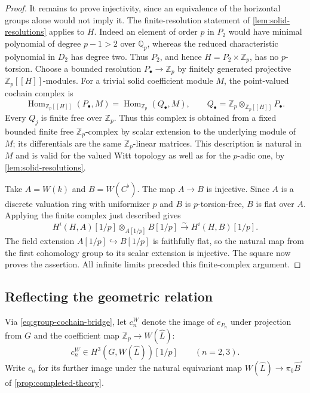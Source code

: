 \documentclass[11pt]{article}
\numberwithin{equation}{section}
\theoremstyle{definition}
\theoremstyle{remark}
\begin{document}
\begin{proof}
It remains to prove injectivity, since an equivalence of the horizontal
groups alone would not imply it.  The finite-resolution statement of
\cref{lem:solid-resolutions} applies to $H$.  Indeed an element of
order $p$ in $P_2$ would have minimal polynomial of degree $p-1>2$
over $\mathbb Q_p$, whereas the reduced characteristic polynomial in $D_2$
has degree two.  Thus $P_2$, and hence $H=P_2\times\mathbb Z_p$, has no
$p$-torsion.
Choose a bounded resolution $P_\bullet\to\mathbb Z_p$ by finitely generated
projective $\mathbb Z_p[[H]]$-modules.  For a trivial solid coefficient module
$M$, the point-valued cochain complex is
\[
 \operatorname{Hom}_{\mathbb Z_p[[H]]}(P_\bullet,M)
   =\operatorname{Hom}_{\mathbb Z_p}(Q_\bullet,M),
 \qquad
 Q_\bullet=\mathbb Z_p\otimes_{\mathbb Z_p[[H]]}P_\bullet.
\]
Every $Q_j$ is finite free over $\mathbb Z_p$.  Thus this complex is obtained
from a fixed bounded finite free $\mathbb Z_p$-complex by scalar extension
to the underlying module of $M$; its differentials are the same
$\mathbb Z_p$-linear matrices.  This description is natural in $M$ and is
valid for the valued Witt topology as well as for the $p$-adic one,
by \cref{lem:solid-resolutions}.

Take $A=W(k)$ and $B=W(C^\flat)$.  The map $A\to B$ is injective.
Since $A$ is a discrete valuation ring with uniformizer $p$ and $B$
is $p$-torsion-free, $B$ is flat over $A$.  Applying the finite
complex just described gives
\begin{equation}\label{eq:witt-scalar-extension}
 H^i(H,A)[1/p]\otimes_{A[1/p]}B[1/p]
   \xrightarrow{\sim}H^i(H,B)[1/p].
\end{equation}
The field extension $A[1/p]\hookrightarrow B[1/p]$ is faithfully
flat, so the natural map from the first cohomology group to its
scalar extension is injective.  The square now proves the assertion.
All infinite limits preceded this finite-complex argument.
\end{proof}

\subsection{Reflecting the geometric relation}

Via \eqref{eq:group-cochain-bridge}, let $c_n^W$ denote the image of
$e_{P_n}$ under projection from $G$ and the coefficient map
$\mathbb Z_p\to W(\widehat L)$:
\[
 c_n^W\in H^3(G,W(\widehat L))[1/p]\qquad(n=2,3).
\]
Write $c_n$ for its further image under the natural equivariant map
$W(\widehat L)\to\pi_0\widehat B^{\square}$ of
\cref{prop:completed-theory}.
\end{document}
